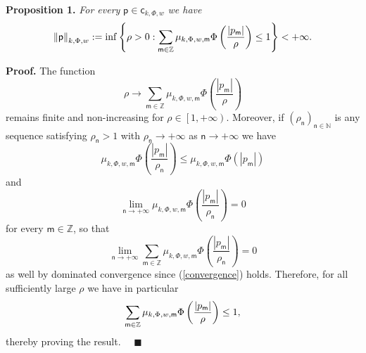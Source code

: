 \documentclass{article}
\begin{document}
\bigskip

\textbf{Proposition 1.} \textit{For every} $\mathsf{p}\in \mathsf{c}_{k,\Phi
,w}$ \textit{we have}%
\begin{equation}
\left\Vert \mathsf{p}\right\Vert _{k,\Phi ,w}:=\inf \left\{ \rho >0:\sum_{%
\mathsf{m}\in \mathbb{Z}}\mu _{k,\Phi ,w,\mathsf{m}}\Phi \left( \frac{%
\left\vert p_{\mathsf{m}}\right\vert }{\rho }\right) \leq 1\right\} <+\infty
.  \label{luxnorm}
\end{equation}

\bigskip

\textbf{Proof. }The function%
\begin{equation*}
\rho \rightarrow \sum_{\mathsf{m}\in \mathbb{Z}}\mu _{k,\Phi ,w,\mathsf{m}%
}\Phi \left( \frac{\left\vert p_{\mathsf{m}}\right\vert }{\rho }\right)
\end{equation*}%
remains finite and non-increasing for $\rho \in \left[ 1,+\infty \right) $.
Moreover, if $\left( \rho _{\mathsf{n}}\right) _{\mathsf{n}\in \mathbb{N}}$
is any sequence satisfying $\rho _{\mathsf{n}}>1$ with $\rho _{\mathsf{n}%
}\rightarrow +\infty $ as $\mathsf{n}\rightarrow +\infty $ we have%
\begin{equation*}
\mu _{k,\Phi ,w,\mathsf{m}}\Phi \left( \frac{\left\vert p_{\mathsf{m}%
}\right\vert }{\rho _{\mathsf{n}}}\right) \leq \mu _{k,\Phi ,w,\mathsf{m}%
}\Phi \left( \left\vert p_{\mathsf{m}}\right\vert \right)
\end{equation*}%
and%
\begin{equation*}
\lim_{\mathsf{n}\rightarrow +\infty }\mu _{k,\Phi ,w,\mathsf{m}}\Phi \left( 
\frac{\left\vert p_{\mathsf{m}}\right\vert }{\rho _{\mathsf{n}}}\right) =0
\end{equation*}%
for every $\mathsf{m}\in \mathbb{Z}$, so that%
\begin{equation*}
\lim_{\mathsf{n}\rightarrow +\infty }\sum_{\mathsf{m}\in \mathbb{Z}}\mu
_{k,\Phi ,w,\mathsf{m}}\Phi \left( \frac{\left\vert p_{\mathsf{m}%
}\right\vert }{\rho _{\mathsf{n}}}\right) =0
\end{equation*}%
as well by dominated convergence since (\ref{convergence}) holds. Therefore,
for all sufficiently large $\rho $ we have in particular%
\begin{equation*}
\sum_{\mathsf{m}\in \mathbb{Z}}\mu _{k,\Phi ,w,\mathsf{m}}\Phi \left( \frac{%
\left\vert p_{\mathsf{m}}\right\vert }{\rho }\right) \leq 1,
\end{equation*}%
thereby proving the result. \ \ $\blacksquare $
\end{document}
